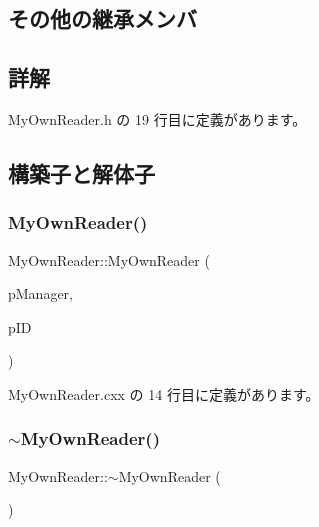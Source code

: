 \subsection*{その他の継承メンバ}


\subsection{詳解}


 My\+Own\+Reader.\+h の 19 行目に定義があります。



\subsection{構築子と解体子}
\mbox{\label{class_my_own_reader_ae08ec70c8c7814b36681599259e31904}} 
\subsubsection{\texorpdfstring{My\+Own\+Reader()}{MyOwnReader()}}
{\footnotesize\ttfamily My\+Own\+Reader\+::\+My\+Own\+Reader (\begin{DoxyParamCaption}\item[{\hyperlink{class_fbx_manager}{Fbx\+Manager} \&}]{p\+Manager,  }\item[{int}]{p\+ID }\end{DoxyParamCaption})}



 My\+Own\+Reader.\+cxx の 14 行目に定義があります。

\mbox{\label{class_my_own_reader_abd01d1e784497c26760db38ae18ee709}} 
\subsubsection{\texorpdfstring{$\sim$\+My\+Own\+Reader()}{~MyOwnReader()}}
{\footnotesize\ttfamily My\+Own\+Reader\+::$\sim$\+My\+Own\+Reader (\begin{DoxyParamCaption}{ }\end{DoxyParamCaption})\hspace{0.3cm}{\ttfamily [virtual]}}



